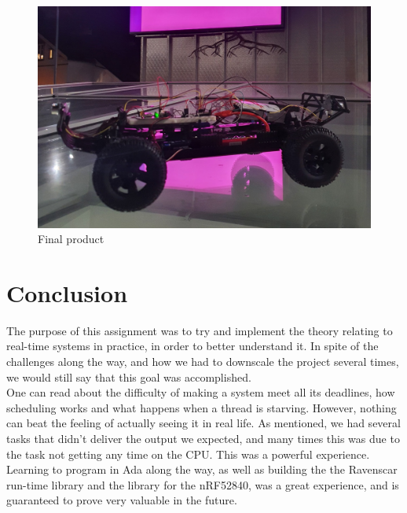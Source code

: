 \documentclass{article}
\begin{document}
\begin{figure}[H]
	\centering
	\includegraphics[width=\linewidth]{showcase.png}
	\caption{Final product}
	\label{showcase}
\end{figure}

\section{Conclusion}

The purpose of this assignment was to try and implement the theory relating to real-time systems in practice, in order to better understand it. In spite of the challenges along the way, and how we had to downscale the project several times, we would still say that this goal was accomplished.\\

One can read about the difficulty of making a system meet all its deadlines, how scheduling works and what happens when a thread is starving. However, nothing can beat the feeling of actually seeing it in real life. As mentioned, we had several tasks that didn't deliver the output we expected, and many times this was due to the task not getting any time on the CPU. This was a powerful experience.\\

Learning to program in Ada along the way, as well as building the the Ravenscar run-time library and the library for the nRF52840, was a great experience, and is guaranteed to prove very valuable in the future.\\

\newpage
\nocite{*}


\end{document}
